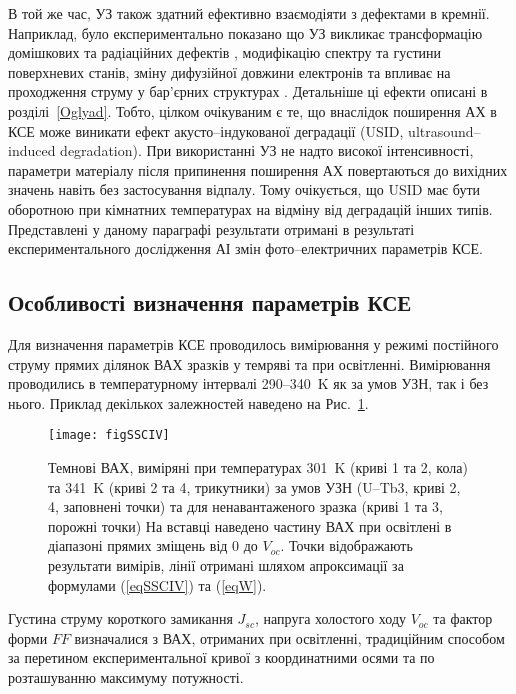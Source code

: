 В той же час, УЗ також здатний ефективно взаємодіяти з дефектами в кремнії.
Наприклад, було експериментально показано що УЗ викликає трансформацію домішкових та радіаційних дефектів \cite{Korotchenkov1995,Ostapenko1995,UST:Medvid,YOlikh:SupMicr},
модифікацію спектру \cite{Zaver:2008} та густини \cite{Mirsagatov} поверхневих станів,
зміну дифузійної довжини електронів \cite{Ostapenko1999,Ostrovskii2001}
та впливає на проходження струму у бар'єрних структурах \cite{Davletova2009,Davletova2008,YOlikh2005}.
Детальніше ці ефекти описані в розділі~\ref{Oglyad}.
Тобто, цілком очікуваним є те, що внаслідок поширення АХ в КСЕ може виникати ефект акусто--індукованої деградації (USID, ultrasound--induced degradation).
При використанні УЗ не надто високої інтенсивності, параметри матеріалу після припинення поширення АХ повертаються до вихідних значень \cite{Ostapenko1999,Ostrovskii2001,Korotchenkov1995} навіть без застосування відпалу.
Тому очікується, що USID має бути оборотною при кімнатних температурах на відміну від деградацій інших типів.
Представлені у даному параграфі результати отримані в результаті експериментального дослідження АІ змін фото--електричних параметрів КСЕ.

\subsection{Особливості визначення параметрів КСЕ\label{sbSSCMethod}}
Для визначення параметрів КСЕ проводилось вимірювання у режимі постійного струму прямих ділянок ВАХ зразків у темряві та при освітленні.
Вимірювання проводились в температурному інтервалі  290--340~K як за умов УЗН, так і без нього.
Приклад декількох залежностей наведено на Рис.~\ref{figSSCIV}.

\begin{figure}
\center
\texttt{[image: figSSCIV]}%
\caption{\label{figSSCIV}
Темнові ВАХ, виміряні при температурах 301~K (криві 1 та 2, кола) та 341~K (криві 2 та 4, трикутники)
за умов УЗН (U--Tb3, криві 2, 4, заповнені точки) та для ненавантаженого зразка (криві 1 та 3, порожні точки)
На вставці наведено частину ВАХ при освітлені в діапазоні прямих зміщень від 0 до $V_{oc}$.
Точки відображають результати вимірів, лінії отримані шляхом апроксимації за формулами (\ref{eqSSCIV}) та (\ref{eqW}).
}%
\end{figure}

Густина струму короткого замикання $J_{sc}$, напруга холостого ходу $V_{oc}$ та фактор форми $F\!F$ визначалися з ВАХ, отриманих при освітленні,
традиційним способом за перетином експериментальної кривої з координатними осями  та по розташуванню максимуму потужності.

